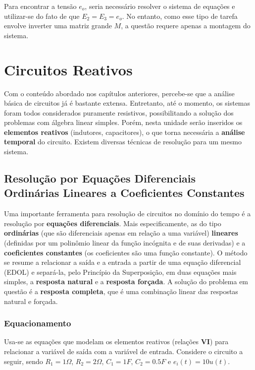 \documentclass{article}
\numberwithin{equation}{section}
\begin{document}
\noindent Para encontrar a tensão $e_o$, seria necessário resolver o sistema de equações e utilizar-se do fato de que $E_2=E_3=e_o$. No entanto, como esse tipo de tarefa envolve inverter uma matriz grande $M$, a questão requere apenas a montagem do sistema.

\newpage

\section{Circuitos Reativos}
\label{sec:reativos}
Com o conteúdo abordado nos capítulos anteriores, percebe-se que a análise básica de circuitos já é bastante extensa. Entretanto, até o momento, os sistemas foram todos considerados puramente resistivos, possibilitando a solução dos problemas com álgebra linear simples. Porém, nesta unidade serão inseridos os \textbf{elementos reativos} (indutores, capacitores), o que torna necessária a \textbf{análise temporal} do circuito. Existem diversas técnicas de resolução para um mesmo sistema.

\subsection{Resolução por Equações Diferenciais Ordinárias Lineares a Coeficientes Constantes}
\label{subsec:edolcc}
Uma importante ferramenta para resolução de circuitos no domínio do tempo é a resolução por \textbf{equações diferenciais}. Mais especificamente, as do tipo \textbf{ordinárias} (que são diferenciais apenas em relação a uma variável) \textbf{lineares} (definidas por um polinômio linear da função incógnita e de suas derivadas) e a \textbf{coeficientes constantes} (os coeficientes são uma função constante). O método se resume a relacionar a saída e a entrada a partir de uma equação diferencial (EDOL) e separá-la, pelo Princípio da Superposição, em duas equações mais simples, a \textbf{resposta natural} e a \textbf{resposta forçada}. A solução do problema em questão é a \textbf{resposta completa}, que é uma combinação linear das respostas natural e forçada.

\subsubsection{Equacionamento}
\label{subsubsec:equacionamento}
Usa-se as equações que modelam os elementos reativos (relações \textbf{VI}) para relacionar a variável de saída com a variável de entrada. Considere o circuito a seguir, sendo $R_1=1\Omega$, $R_2=2\Omega$, $C_1=1F$, $C_2=0.5F$ e $e_i(t) = 10u(t)$.
\end{document}
